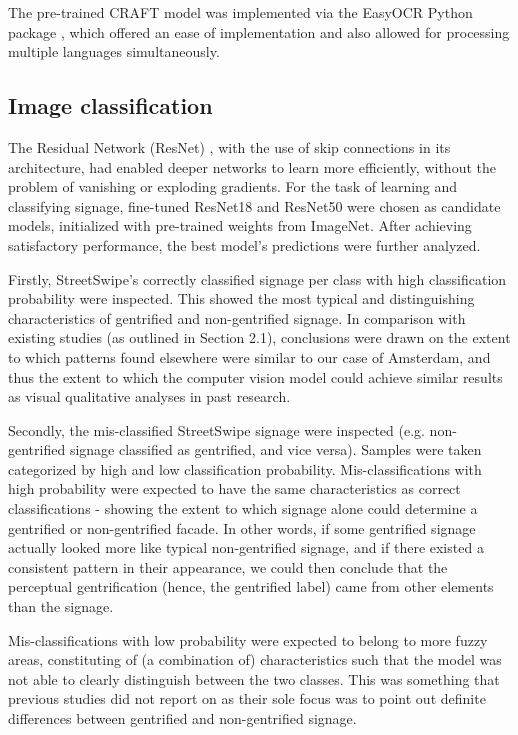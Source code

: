 The pre-trained CRAFT model was implemented via the EasyOCR Python package \cite{noauthor_jaided_nodate}, which offered an ease of implementation and also allowed for processing multiple languages simultaneously.

\subsection{Image classification}
The Residual Network (ResNet) \cite{resnet}, with the use of skip connections in its architecture, had enabled deeper networks to learn more efficiently, without the problem of vanishing or exploding gradients. For the task of learning and classifying signage, fine-tuned ResNet18 and ResNet50 were chosen as candidate models, initialized with pre-trained weights from ImageNet. After achieving satisfactory performance, the best model's predictions were further analyzed. 

Firstly, StreetSwipe's correctly classified signage per class with high classification probability were inspected. This showed the most typical and distinguishing characteristics of gentrified and non-gentrified signage. In comparison with existing studies (as outlined in Section 2.1), conclusions were drawn on the extent to which patterns found elsewhere were similar to our case of Amsterdam, and thus the extent to which the computer vision model could achieve similar results as visual qualitative analyses in past research.

Secondly, the mis-classified StreetSwipe signage were inspected (e.g. non-gentrified signage classified as gentrified, and vice versa). Samples were taken categorized by high and low classification probability. Mis-classifications with high probability were expected to have the same characteristics as correct classifications - showing the extent to which signage alone could determine a gentrified or non-gentrified facade. In other words, if some gentrified signage actually looked more like typical non-gentrified signage, and if there existed a consistent pattern in their appearance, we could then conclude that the perceptual gentrification (hence, the gentrified label) came from other elements than the signage.

Mis-classifications with low probability were expected to belong to more fuzzy areas, constituting of (a combination of) characteristics such that the model was not able to clearly distinguish between the two classes. This was something that previous studies did not report on as their sole focus was to point out definite differences between gentrified and non-gentrified signage.

